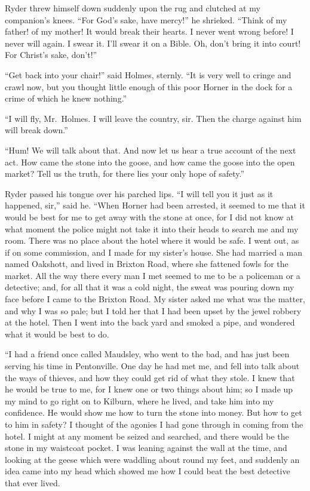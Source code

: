 Ryder threw himself down suddenly upon the rug and
clutched at my companion’s knees. “For God’s sake, have
mercy!” he shrieked. “Think of my father! of my mother!
It would break their hearts. I never went wrong before! I
never will again. I swear it. I’ll swear it on a Bible. Oh,
don’t bring it into court! For Christ’s sake, don’t!”

“Get back into your chair!” said Holmes, sternly. “It is
very well to cringe and crawl now, but you thought little
enough of this poor Horner in the dock for a crime of which
he knew nothing.”

“I will fly, Mr.~Holmes. I will leave the country, sir. Then
the charge against him will break down.”

“Hum! We will talk about that. And now let us hear a
true account of the next act. How came the stone into the
goose, and how came the goose into the open market? Tell
us the truth, for there lies your only hope of safety.”

Ryder passed his tongue over his parched lips. “I will tell
you it just as it happened, sir,” said he. “When Horner had
been arrested, it seemed to me that it would be best for me
to get away with the stone at once, for I did not know at what
moment the police might not take it into their heads to search
me and my room. There was no place about the hotel where
it would be safe. I went out, as if on some commission, and
I made for my sister’s house. She had married a man named
Oakshott, and lived in Brixton Road, where she fattened fowls
for the market. All the way there every man I met seemed to
me to be a policeman or a detective; and, for all that it was
a cold night, the sweat was pouring down my face before I
came to the Brixton Road. My sister asked me what was the
matter, and why I was so pale; but I told her that I had been
upset by the jewel robbery at the hotel. Then I went into the
back yard and smoked a pipe, and wondered what it would
be best to do.

“I had a friend once called Maudsley, who went to the bad,
and has just been serving his time in Pentonville. One day
he had met me, and fell into talk about the ways of thieves,
and how they could get rid of what they stole. I knew that
he would be true to me, for I knew one or two things about
him; so I made up my mind to go right on to Kilburn, where
he lived, and take him into my confidence. He would show
me how to turn the stone into money. But how to get to him
in safety? I thought of the agonies I had gone through in
coming from the hotel. I might at any moment be seized and
searched, and there would be the stone in my waistcoat pocket.
I was leaning against the wall at the time, and looking at the
geese which were waddling about round my feet, and suddenly
an idea came into my head which showed me how I could
beat the best detective that ever lived.

